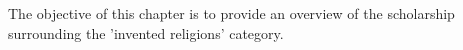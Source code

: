 \documentclass[Draft.tex]{subfiles}
\begin{document}

The objective of this chapter is to provide an overview
of the scholarship surrounding the 'invented religions' category.

\printbibliography
\end{document}

